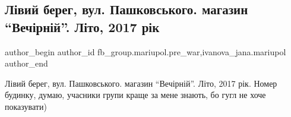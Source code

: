  
 
 
 
 

\subsection{Лівий берег, вул. Пашковського. магазин \enquote{Вечірній}. Літо, 2017 рік}
\label{sec:27_02_2023.fb.fb_group.mariupol.pre_war.3.l_vii_bereg__vul__pa}
 
\ifcmt
 author_begin
   author_id fb_group.mariupol.pre_war,ivanova_jana.mariupol
 author_end
\fi

Лівий берег, вул. Пашковського. магазин \enquote{Вечірній}. Літо, 2017 рік. Номер
будинку, думаю, учасники групи краще за мене знають, бо гугл не хоче
показувати)

